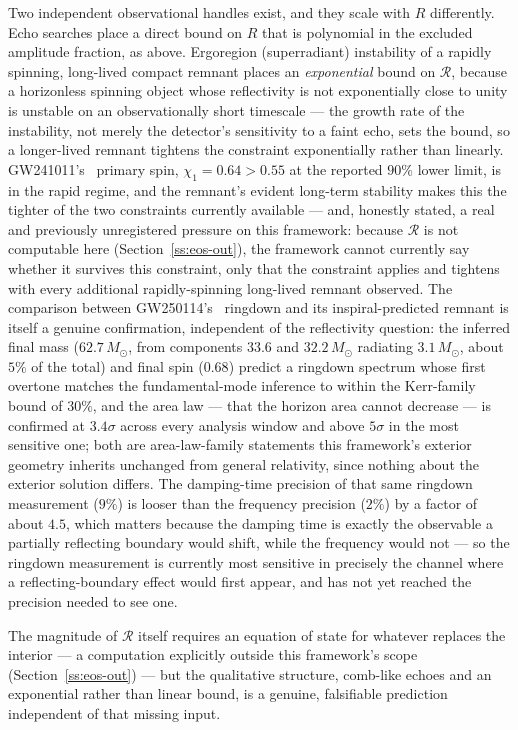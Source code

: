 \documentclass[aps,prd,twocolumn,superscriptaddress,nofootinbib]{revtex4-2}
\begin{document}
Two independent observational handles exist, and they scale with $R$
differently. Echo searches place a direct bound on $R$ that is
polynomial in the excluded amplitude fraction, as above. Ergoregion
(superradiant) instability of a rapidly spinning, long-lived compact
remnant places an \emph{exponential} bound on $\mathcal{R}$, because a
horizonless spinning object whose reflectivity is not exponentially
close to unity is unstable on an observationally short timescale — the
growth rate of the instability, not merely the detector's sensitivity to
a faint echo, sets the bound, so a longer-lived remnant tightens the
constraint exponentially rather than linearly. GW241011's~\cite{GW241011}
primary spin, $\chi_1=0.64>0.55$ at the reported $90\%$ lower limit, is in the rapid
regime, and the remnant's evident long-term stability makes this the
tighter of the two constraints currently available — and, honestly
stated, a real and previously unregistered pressure on this framework:
because $\mathcal{R}$ is not computable here (Section~\ref{ss:eos-out}),
the framework cannot currently say whether it survives this constraint,
only that the constraint applies and tightens with every additional
rapidly-spinning long-lived remnant observed. The comparison
between GW250114's~\cite{GW250114} ringdown and its inspiral-predicted remnant is itself
a genuine confirmation, independent of the reflectivity question: the
inferred final mass ($62.7\,M_\odot$, from components $33.6$ and
$32.2\,M_\odot$ radiating $3.1\,M_\odot$, about $5\%$ of the total) and
final spin ($0.68$) predict a ringdown spectrum whose first overtone
matches the fundamental-mode inference to within the Kerr-family bound
of $30\%$, and the area law — that the horizon area cannot decrease — is
confirmed at $3.4\sigma$ across every analysis window and above $5\sigma$
in the most sensitive one; both are area-law-family statements this
framework's exterior geometry inherits unchanged from general relativity,
since nothing about the exterior solution differs. The damping-time
precision of that same ringdown measurement ($9\%$) is looser than the
frequency precision ($2\%$) by a factor of about $4.5$, which matters because
the damping time is exactly the observable a partially reflecting
boundary would shift, while the frequency would not — so the ringdown
measurement is currently most sensitive in precisely the channel where a
reflecting-boundary effect would first appear, and has not yet reached
the precision needed to see one.

The magnitude of $\mathcal{R}$ itself requires an
equation of state for whatever replaces the interior — a computation
explicitly outside this framework's scope (Section~\ref{ss:eos-out}) —
but the qualitative structure, comb-like echoes and an exponential rather
than linear bound, is a genuine, falsifiable prediction independent of
that missing input.
\end{document}
